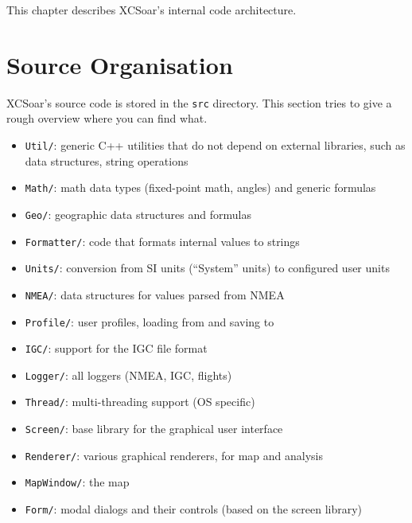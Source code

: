 \documentclass[a4paper,12pt]{refrep}
\begin{document}
This chapter describes XCSoar's internal code architecture.

\section{Source Organisation}

XCSoar's source code is stored in the \texttt{src} directory.  This
section tries to give a rough overview where you can find what.

\begin{itemize}

\item \texttt{Util/}: generic C++ utilities that do not depend on
  external libraries, such as data structures, string operations

\item \texttt{Math/}: math data types (fixed-point math, angles) and
  generic formulas

\item \texttt{Geo/}: geographic data structures and formulas

\item \texttt{Formatter/}: code that formats internal values to
  strings

\item \texttt{Units/}: conversion from SI units (``System'' units) to
  configured user units

\item \texttt{NMEA/}: data structures for values parsed from NMEA

\item \texttt{Profile/}: user profiles, loading from and saving to

\item \texttt{IGC/}: support for the IGC file format

\item \texttt{Logger/}: all loggers (NMEA, IGC, flights)

\item \texttt{Thread/}: multi-threading support (OS specific)

\item \texttt{Screen/}: base library for the graphical user interface

\item \texttt{Renderer/}: various graphical renderers, for map and
  analysis

\item \texttt{MapWindow/}: the map

\item \texttt{Form/}: modal dialogs and their controls (based on the
  screen library)


\end{itemize}
\end{document}
